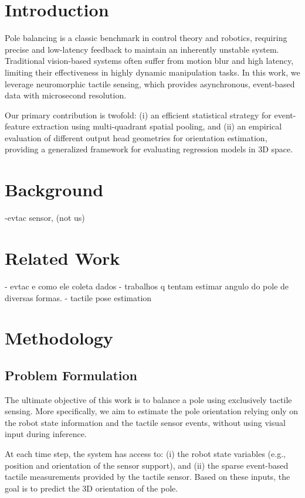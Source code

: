 \documentclass{article}
\begin{document}
\section{Introduction}
\label{intro}

Pole balancing is a classic benchmark in control theory and robotics, requiring precise and low-latency feedback to maintain an inherently unstable system. Traditional vision-based systems often suffer from motion blur and high latency, limiting their effectiveness in highly dynamic manipulation tasks. In this work, we leverage neuromorphic tactile sensing, which provides asynchronous, event-based data with microsecond resolution.

Our primary contribution is twofold: (i) an efficient statistical strategy for event-feature extraction using multi-quadrant spatial pooling, and (ii) an empirical evaluation of different output head geometries for orientation estimation, providing a generalized framework for evaluating regression models in 3D space.

\section{Background}
-evtac sensor, (not us)
\section{Related Work}
- evtac e como ele coleta dados
- trabalhos q tentam estimar angulo do pole de diversas formas.
- tactile pose estimation
\section{Methodology}
\subsection{Problem Formulation}
The ultimate objective of this work is to balance a pole using exclusively tactile sensing.
More specifically, we aim to estimate the pole orientation relying only on the robot state
information and the tactile sensor events, without using visual input during inference.

At each time step, the system has access to: (i) the robot state variables
(e.g., position and orientation of the sensor support),
and (ii) the sparse event-based tactile measurements provided by the tactile sensor.
Based on these inputs, the goal is to predict the 3D orientation of the pole.
\end{document}
